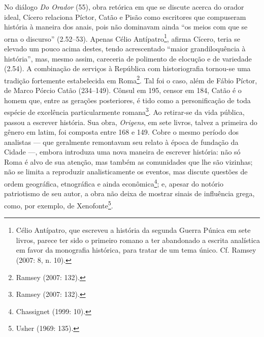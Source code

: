 No diálogo \emph{Do Orador} (55), obra retórica em que se discute acerca
do orador ideal, Cícero relaciona Píctor, Catão e Pisão como escritores que
compuseram história à maneira dos anais, pois não dominavam ainda “os meios com
que se orna o discurso” (2.52--53). Apenas Célio Antípatro\footnote{Célio
Antípatro, que escreveu a história da segunda Guerra Púnica em sete livros,
parece ter sido o primeiro romano a ter abandonado a escrita analística em
favor da monografia histórica, para tratar de um tema único.  Cf. Ramsey
(2007: 8, n. 10).}, afirma Cícero, teria se elevado um pouco acima destes,
tendo acrescentado “maior grandiloquência à história”, mas, mesmo assim,
careceria de polimento de elocução e de variedade (2.54).  A combinação de
serviços à República com historiografia tornou-se uma tradição fortemente
estabelecida em Roma\footnote{Ramsey
(2007: 132).}. Tal foi o caso, além de
Fábio Píctor, de Marco Pórcio Catão (234--149). Cônsul em 195, censor em 184,
Catão é o homem que, entre as gerações posteriores, é tido como a
personificação de toda espécie de excelência particularmente romana\footnote{Ramsey
(2007: 132).}. Ao retirar-se da vida pública, passou a escrever história.
Sua obra, \emph{Origens}, em sete livros, talvez a primeira do gênero em latim,
foi composta entre 168 e 149. Cobre o mesmo período dos analistas --- que
geralmente remontavam seu relato à época de fundação da Cidade ---, embora
introduza uma nova maneira de escrever história: não só Roma é alvo de sua
atenção, mas também as comunidades que lhe são vizinhas; não se limita a
reproduzir analisticamente os eventos, mas discute questões de ordem
geográfica, etnográfica e ainda econômica\footnote{Chassignet (1999: 10).};
e, apesar do notório patriotismo de seu autor, a obra não deixa de mostrar
sinais de influência grega, como, por exemplo, de Xenofonte\footnote{Usher (1969: 135).}.

